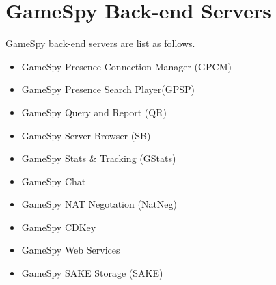 \documentclass[oneside,titlepage,a4paper]{Definition/retrospy} %
\begin{document}
\section{GameSpy Back-end Servers}
\par GameSpy back-end servers are list as follows.
	\begin{itemize}
		\item GameSpy Presence Connection Manager (GPCM)
		\item GameSpy Presence Search Player(GPSP)
		\item GameSpy Query and Report (QR)
		\item GameSpy Server Browser (SB)
		\item GameSpy Stats \& Tracking (GStats)
		\item GameSpy Chat
		\item GameSpy NAT Negotation (NatNeg)
		\item GameSpy CDKey 
		\item GameSpy Web Services
		\item GameSpy SAKE Storage (SAKE)
	\end{itemize}
\end{document}
